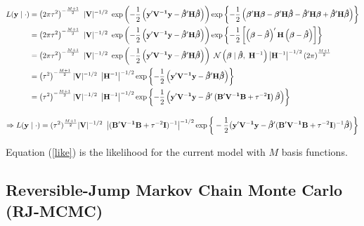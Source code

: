 \documentclass[
]{article}
\begin{document}
\[
\begin{aligned}
L({\bf y}\mid\cdot) &= \left(2\pi\tau^2\right)^{-\frac{M+1}{2}}~ |{\bf V}|^{-1/2}~\exp\left(-\frac{1}{2}\left({\bf y'V^{-1}y} - \boldsymbol{\hat{\beta}}' {\bf H} \boldsymbol{\hat\beta}\right)\right)
\exp\left\lbrace-\frac{1}{2}\left(\boldsymbol\beta'{\bf H}\boldsymbol\beta - \boldsymbol\beta'{\bf H}\boldsymbol{\hat{\beta}} - \boldsymbol{\hat{\beta}}'{\bf H}\boldsymbol\beta + \boldsymbol{\hat{\beta}}'{\bf H}\boldsymbol{\hat{\beta}} \right)\right\rbrace\\
&= \left(2\pi\tau^2\right)^{-\frac{M+1}{2}}~ |{\bf V}|^{-1/2}~\exp\left(-\frac{1}{2}\left({\bf y'V^{-1}y} - \boldsymbol{\hat{\beta}}' {\bf H} \boldsymbol{\hat\beta}\right)\right)
\exp\left\lbrace-\frac{1}{2}\left[\left(\boldsymbol\beta -\boldsymbol{\hat{\beta}} \right)'{\bf H}\left(\boldsymbol\beta -\boldsymbol{\hat{\beta}}\right)\right]\right\rbrace\\
&= \left(2\pi\tau^2\right)^{-\frac{M+1}{2}}~ |{\bf V}|^{-1/2}~ \exp\left(-\frac{1}{2}\left({\bf y'V^{-1}y} - \boldsymbol{\hat{\beta}}' {\bf H} \boldsymbol{\hat\beta}\right)\right)~
\mathcal N\left(\boldsymbol\beta \mid \boldsymbol{\hat\beta}, ~{\bf H}^{-1}\right) \left|{\bf H}^{-1}\right|^{-1/2}\left(2\pi\right)^{\frac{M+1}{2}}\\
&= \left(\tau^2\right)^{-\frac{M+1}{2}}  |{\bf V}|^{-1/2}~ \left|{\bf H}^{-1}\right|^{-1/2} \exp\left\lbrace-\frac{1}{2}\left({\bf y'V^{-1}y} - \boldsymbol{\hat{\beta}}' {\bf H} \boldsymbol{\hat\beta}\right)\right\rbrace\\
&= \left(\tau^2\right)^{-\frac{M+1}{2}}  |{\bf V}|^{-1/2}~ \left|{\bf H}^{-1}\right|^{-1/2} \exp\left\lbrace-\frac{1}{2}\left({\bf y'V^{-1}y} - \boldsymbol{\hat{\beta}}' \left({\bf B'V^{-1}B} + \tau^{-2}{\bf I}\right) \boldsymbol{\hat\beta}\right)\right\rbrace
\end{aligned} 
\]

\begin{equation}
\label{like}
\Rightarrow L({\bf y}\mid\cdot) = (\tau^2)^{\frac{M+1}{2}} |{\bf V}|^{-1/2} ~\left|({\bf B'V^{-1}B} +{\tau^{-2}} {\bf I})^{-1}\right|^{-1/2} \exp\bigg\lbrace -\frac{1}{2}\big({\bf y'V^{-1}y} - \boldsymbol{\hat\beta}' ({\bf B'V^{-1}B} +{\tau^{-2}} {\bf I})^{-1}\boldsymbol{\hat\beta}\big) \bigg\rbrace
\end{equation}

Equation (\ref{like}) is the likelihood for the current model with \(M\)
basis functions.\newline

\hypertarget{reversible-jump-markov-chain-monte-carlo-rj-mcmc}{%
\subsection{Reversible-Jump Markov Chain Monte Carlo
(RJ-MCMC)}\label{reversible-jump-markov-chain-monte-carlo-rj-mcmc}}
\end{document}
